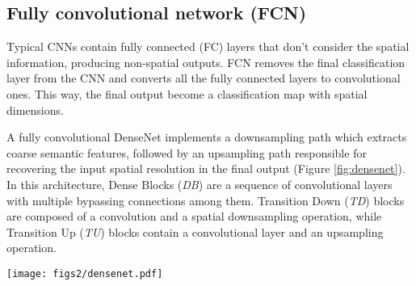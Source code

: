 \subsection{Fully convolutional network (FCN)}

Typical CNNs contain fully connected (FC) layers that don't consider the spatial information, producing non-spatial outputs. FCN removes the final classification layer from the CNN and converts all the fully connected layers to convolutional ones. This way, the final output become a classification map with spatial dimensions. 

A fully convolutional DenseNet \cite{jegou2017one} implements a downsampling path which extracts coarse semantic features, followed by an upsampling path responsible for recovering the input spatial resolution in the final output (Figure \ref{fig:densenet}). In this architecture, Dense Blocks (\textit{DB})  are  a  sequence  of  convolutional  layers  with multiple bypassing connections among them. Transition Down (\textit{TD}) blocks are composed of a convolution and a spatial downsampling operation, while Transition Up (\textit{TU}) blocks contain a convolutional layer and an upsampling operation. 

\begin{figure*}[t!]
\centering
\texttt{[image: figs2/densenet.pdf]}
\caption{FCN-PL architecture. (Circles represent concatenation)}
\label{fig:densenet}
\end{figure*}


